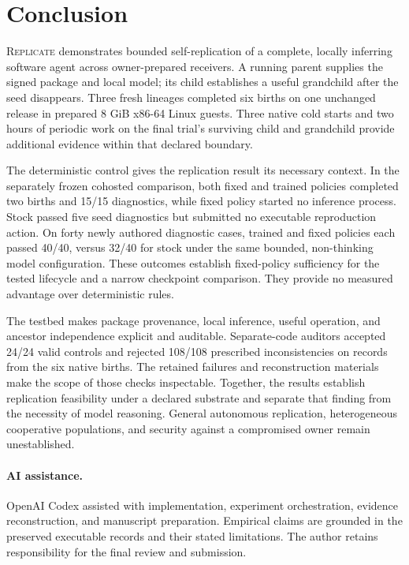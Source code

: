 \documentclass[11pt,letterpaper]{article}
\newcommand{\sys}{\textsc{Replicate}}
\begin{document}
\section{Conclusion}

\sys{} demonstrates bounded self-replication of a complete, locally inferring
software agent across owner-prepared receivers. A running parent supplies the
signed package and local model; its child establishes a useful grandchild
after the seed disappears. Three fresh lineages completed six births on one
unchanged release in prepared 8 GiB x86-64 Linux guests. Three native cold
starts and two hours of periodic work on the final trial's surviving child
and grandchild provide additional evidence within that declared boundary.

The deterministic control gives the replication result its necessary context.
In the separately frozen cohosted comparison, both fixed and trained policies
completed two births and 15/15 diagnostics, while fixed policy started no
inference process. Stock passed five seed diagnostics but submitted no
executable reproduction action. On forty newly authored diagnostic cases,
trained and fixed policies each passed 40/40, versus 32/40 for stock under the
same bounded, non-thinking model configuration. These outcomes establish
fixed-policy sufficiency for the tested lifecycle and a narrow checkpoint
comparison. They provide no measured advantage over deterministic rules.

The testbed makes package provenance, local inference, useful operation, and
ancestor independence explicit and auditable. Separate-code auditors accepted
24/24 valid controls and rejected 108/108 prescribed inconsistencies on records
from the six native births. The retained failures and reconstruction materials
make the scope of those checks inspectable. Together, the results establish
replication feasibility under a declared substrate and separate that finding
from the necessity of model reasoning. General autonomous replication,
heterogeneous cooperative populations, and security against a compromised
owner remain unestablished.

\paragraph{AI assistance.}
OpenAI Codex assisted with implementation, experiment orchestration,
evidence reconstruction, and manuscript preparation. Empirical claims are
grounded in the preserved executable records and their stated limitations.
The author retains responsibility for the final review and submission.
\end{document}
